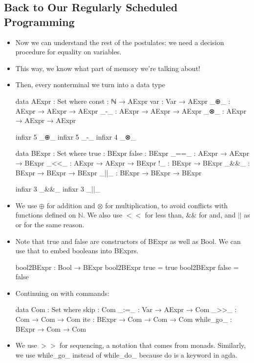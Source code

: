 \documentclass{lecturenotes}
\begin{document}
\subsection{Back to Our Regularly Scheduled Programming}
\label{sec:back-our-regularly}

\begin{itemize}
\item Now we can understand the rest of the postulates: we need a decision procedure for equality on variables.
\item This way, we know what part of memory we're talking about!
\item Then, every nonterminal we turn into a data type
\begin{code}
data AExpr : Set where
  const : ℕ → AExpr
  var : Var → AExpr
  _⊕_ : AExpr → AExpr → AExpr
  _-_ : AExpr → AExpr → AExpr
  _⊗_ : AExpr → AExpr → AExpr

infixr 5 _⊕_
infixr 5 _-_
infixr 4 _⊗_

data BExpr : Set where
  true : BExpr
  false : BExpr
  _==_ : AExpr → AExpr → BExpr
  _<<_ : AExpr → AExpr → BExpr
  !_ : BExpr → BExpr
  _&&_ : BExpr → BExpr → BExpr
  _||_ : BExpr → BExpr → BExpr

infixr 3 _&&_
infixr 3 _||_    
\end{code}
\item We use $\oplus$ for addition and $\otimes$ for multiplication, to avoid conflicts with functions defined on $\mathbb{N}$.
  We also use $<<$ for less than, $\&\&$ for and, and $||$ as or for the same reason.
\item Note that \textsf{true} and \textsf{false} are constructors of \textsf{BExpr} as well as \textsf{Bool}.
  We can use that to embed booleans into \textsf{BExpr}s.
\begin{code}
bool2BExpr : Bool → BExpr
bool2BExpr true = true
bool2BExpr false = false
\end{code}
\item Continuing on with commands:
\begin{code}
data Com : Set where
  skip : Com
  _:=_ : Var → AExpr → Com
  _>>_ : Com → Com → Com
  ite : BExpr → Com → Com → Com
  while_go_ : BExpr → Com → Com    
\end{code}
\item We use $>>$ for sequencing, a notation that comes from monads.
  Similarly, we use \textsf{while\_go\_} instead of \textsf{while\_do\_} because \textsf{do} is a keyword in agda.
\end{itemize}
\end{document}
